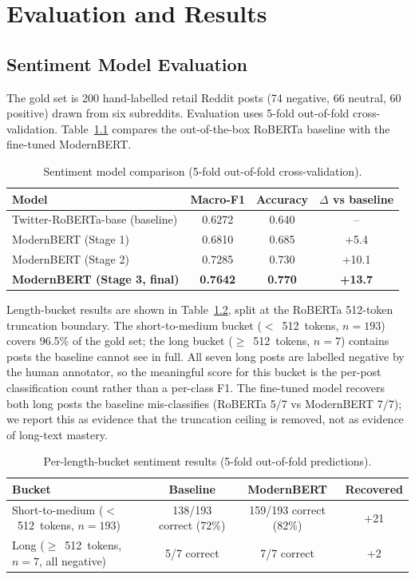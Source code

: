 \chapter{Evaluation and Results}\label{ch:eval}

\section{Sentiment Model Evaluation}\label{sec:senteval}
The gold set is 200 hand-labelled retail Reddit posts (74 negative, 66
neutral, 60 positive) drawn from six subreddits.  Evaluation uses 5-fold
out-of-fold cross-validation.  Table~\ref{tab:sent} compares the
out-of-the-box RoBERTa baseline with the fine-tuned ModernBERT.

\begin{table}[htbp]\centering
\caption{Sentiment model comparison (5-fold out-of-fold cross-validation).}\label{tab:sent}
\begin{tabular}{@{}lccc@{}}\toprule
\bfseries Model & \bfseries Macro-F1 & \bfseries Accuracy & \bfseries $\Delta$ vs baseline\\\midrule
Twitter-RoBERTa-base (baseline) & 0.6272 & 0.640 & --\\
ModernBERT (Stage 1)            & 0.6810 & 0.685 & +5.4\\
ModernBERT (Stage 2)            & 0.7285 & 0.730 & +10.1\\
\textbf{ModernBERT (Stage 3, final)} & \textbf{0.7642} & \textbf{0.770} & \textbf{+13.7}\\\bottomrule
\end{tabular}
\end{table}

Length-bucket results are shown in Table~\ref{tab:sentlen}, split at the
RoBERTa 512-token truncation boundary.  The short-to-medium bucket
($<$~512~tokens, $n{=}193$) covers 96.5\% of the gold set; the long
bucket ($\ge$~512~tokens, $n{=}7$) contains posts the baseline cannot
see in full.  All seven long posts are labelled negative by the human
annotator, so the meaningful score for this bucket is the per-post
classification count rather than a per-class F1.  The fine-tuned model
recovers both long posts the baseline mis-classifies (RoBERTa 5/7 vs
ModernBERT 7/7); we report this as evidence that the truncation ceiling
is removed, not as evidence of long-text mastery.

\begin{table}[htbp]\centering
\caption{Per-length-bucket sentiment results (5-fold out-of-fold predictions).}\label{tab:sentlen}
\begin{tabular}{@{}lccc@{}}\toprule
\bfseries Bucket & \bfseries Baseline & \bfseries ModernBERT & \bfseries Recovered\\\midrule
Short-to-medium ($<$~512~tokens, $n{=}193$)  & 138/193 correct (72\%) & 159/193 correct (82\%) & +21\\
Long ($\ge$~512~tokens, $n{=}7$, all negative) & 5/7 correct           & 7/7 correct           & +2\\\bottomrule
\end{tabular}
\end{table}

